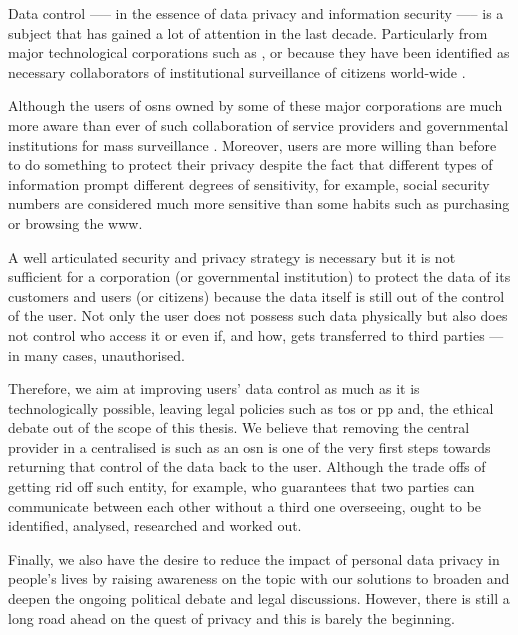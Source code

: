 \documentclass[showtrims,oldfontcommands]{kthesis}
\begin{document}
Data control —-- in the essence of data privacy and information security —-- is a 
subject that has gained a lot of attention in the last decade. Particularly from 
major technological corporations such as \Google, \Apple or \Facebook because they 
have been identified as necessary collaborators of institutional surveillance of 
citizens world-wide \cite{Lyon14}.

Although the users of \acp{osn} owned by some of these major corporations are much more 
aware than ever of such collaboration of service providers and governmental institutions 
for mass surveillance \cite{Madden14}. Moreover, users are more willing than before 
to do something to protect their privacy despite the fact that different types of 
information prompt different degrees of sensitivity, for example, social security 
numbers are considered much more sensitive than some habits such as purchasing or 
browsing the \ac{www}.

A well articulated security and privacy strategy is necessary but it is not sufficient 
for a corporation (or governmental institution) to protect the data of its customers 
and users (or citizens) because the data itself is still out of the control of the 
user. Not only the user does not possess such data physically but also does not 
control who access it or even if, and how, gets transferred to third parties --- 
in many cases, unauthorised.

Therefore, we aim at improving users' data control as much as it is technologically 
possible, leaving legal policies such as \ac{tos} or \ac{pp} and, the ethical debate 
out of the scope of this thesis. We believe that removing the central provider in 
a centralised \ac{is} such as an \ac{osn} is one of the very first steps towards 
returning that control of the data back to the user. Although the trade offs of 
getting rid off such entity, for example, who guarantees that two parties can communicate 
between each other without a third one overseeing, ought to be identified, analysed, 
researched and worked out.

Finally, we also have the desire to reduce the impact of personal data privacy in 
people's lives by raising awareness on the topic with our solutions to broaden and 
deepen the ongoing political debate and legal discussions. However, there is still 
a long road ahead on the quest of privacy and this is barely the beginning.
\end{document}
